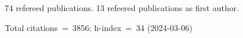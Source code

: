 74 refereed publications. 13 refeered publications as first author.

Total citations~=~3856; h-index~=~34 (2024-03-06)